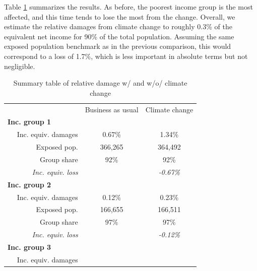 \documentclass[12pt]{article}
\begin{document}
Table \ref{tab_rel_damage_cchange} summarizes the results. As before, the poorest income group is the most affected, and this time tends to lose the most from the change. Overall, we estimate the relative damages from climate change to roughly 0.3\% of the equivalent net income for 90\% of the total population. Assuming the same exposed population benchmark as in the previous comparison, this would correspond to a loss of 1.7\%, which is less important in absolute terms but not negligible.

\begin{table}[htbp!]
\centering
\caption{Summary table of relative damage w/ and w/o/ climate change}
\label{tab_rel_damage_cchange}
\begin{tabular}{lll}
\cline{1-3}
\multicolumn{1}{c}{} &
\multicolumn{1}{c}{Business as usual} &
\multicolumn{1}{c}{Climate change}\\
\cline{1-3}
\multicolumn{1}{l}{\textbf{Inc. group 1}} &
\multicolumn{1}{c}{} &
\multicolumn{1}{c}{}\\
\multicolumn{1}{r}{$\quad$ Inc. equiv. damages} &
\multicolumn{1}{c}{0.67\%} &
\multicolumn{1}{c}{1.34\%}\\
\multicolumn{1}{r}{$\quad$ Exposed pop.} &
\multicolumn{1}{c}{366,265} &
\multicolumn{1}{c}{364,492}\\
\multicolumn{1}{r}{$\quad$ Group share} &
\multicolumn{1}{c}{92\%} &
\multicolumn{1}{c}{92\%}\\
\multicolumn{1}{r}{$\quad$ \textit{Inc. equiv. loss}} &
\multicolumn{1}{c}{\cellcolor{gray!25}} &
\multicolumn{1}{c}{\textit{-0.67\%}}\\
\cline{1-3}
\multicolumn{1}{l}{\textbf{Inc. group 2}} &
\multicolumn{1}{c}{} &
\multicolumn{1}{c}{}\\
\multicolumn{1}{r}{$\quad$ Inc. equiv. damages} &
\multicolumn{1}{c}{0.12\%} &
\multicolumn{1}{c}{0.23\%}\\
\multicolumn{1}{r}{$\quad$ Exposed pop.} &
\multicolumn{1}{c}{166,655} &
\multicolumn{1}{c}{166,511}\\
\multicolumn{1}{r}{$\quad$ Group share} &
\multicolumn{1}{c}{97\%} &
\multicolumn{1}{c}{97\%}\\
\multicolumn{1}{r}{$\quad$ \textit{Inc. equiv. loss}} &
\multicolumn{1}{c}{\cellcolor{gray!25}} &
\multicolumn{1}{c}{\textit{-0.12\%}}\\
\cline{1-3}
\multicolumn{1}{l}{\textbf{Inc. group 3}} &
\multicolumn{1}{c}{} &
\multicolumn{1}{c}{}\\
\multicolumn{1}{r}{$\quad$ Inc. equiv. damages} &

\end{tabular}
\end{table}
\end{document}
